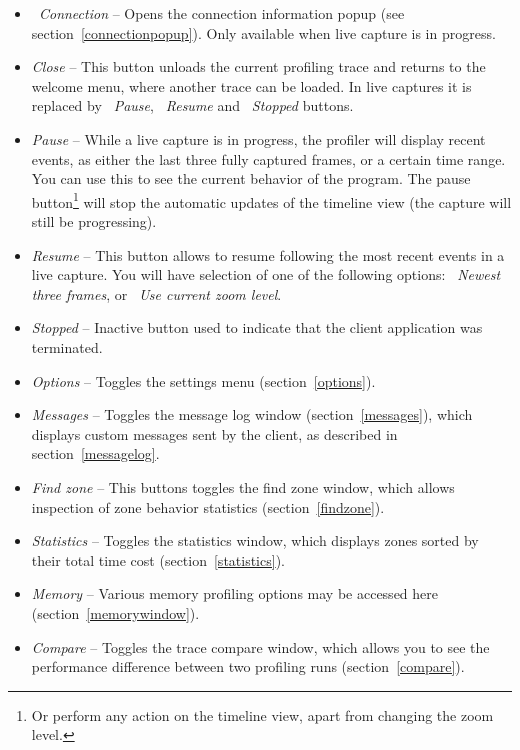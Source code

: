 \documentclass[hidelinks,titlepage,a4paper,twoside]{article}
\begin{document}
\begin{itemize}
\item \emph{\faWifi{}~Connection} -- Opens the connection information popup (see section~\ref{connectionpopup}). Only available when live capture is in progress.
\item \emph{\faPowerOff{} Close} -- This button unloads the current profiling trace and returns to the welcome menu, where another trace can be loaded. In live captures it is replaced by \emph{\faPause{}~Pause}, \emph{\faPlay{}~Resume} and \emph{\faSquare{}~Stopped} buttons.
\item \emph{\faPause{} Pause} -- While a live capture is in progress, the profiler will display recent events, as either the last three fully captured frames, or a certain time range. You can use this to see the current behavior of the program. The pause button\footnote{Or perform any action on the timeline view, apart from changing the zoom level.} will stop the automatic updates of the timeline view (the capture will still be progressing).
\item \emph{\faPlay{} Resume} -- This button allows to resume following the most recent events in a live capture. You will have selection of one of the following options: \emph{\faSearchPlus{}~Newest three frames}, or \emph{\faRulerHorizontal{}~Use current zoom level}.
\item \emph{\faSquare{} Stopped} -- Inactive button used to indicate that the client application was terminated.
\item \emph{\faCog{} Options} -- Toggles the settings menu (section~\ref{options}).
\item \emph{\faTags{} Messages} -- Toggles the message log window (section~\ref{messages}), which displays custom messages sent by the client, as described in section~\ref{messagelog}.
\item \emph{\faSearch{} Find zone} -- This buttons toggles the find zone window, which allows inspection of zone behavior statistics (section~\ref{findzone}).
\item \emph{\faSortAmountUp{} Statistics} -- Toggles the statistics window, which displays zones sorted by their total time cost (section~\ref{statistics}).
\item \emph{\faMemory{} Memory} -- Various memory profiling options may be accessed here (section~\ref{memorywindow}).
\item \emph{\faBalanceScale{} Compare} -- Toggles the trace compare window, which allows you to see the performance difference between two profiling runs (section~\ref{compare}).

\end{itemize}
\end{document}
